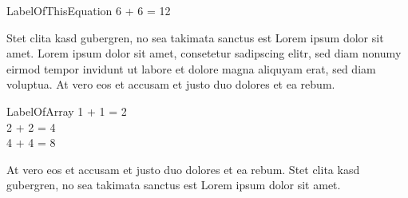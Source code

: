 \begin{EOAequation}{LabelOfThisEquation}
6 + 6 = 12
\end{EOAequation}

\begin{EOAquote}
Stet clita kasd gubergren, no sea
takimata sanctus est Lorem ipsum dolor sit amet.
Lorem ipsum dolor sit amet, consetetur sadipscing
elitr, sed diam nonumy eirmod tempor invidunt ut
labore et dolore magna aliquyam erat, sed diam
voluptua. At vero eos et accusam et justo duo
dolores et ea
rebum.
\end{EOAquote}

\begin{EOAequationarray}{LabelOfArray}
	1 + 1 = 2\\
	2 + 2 = 4\\
	4 + 4 = 8
\end{EOAequationarray}


At vero eos et accusam et justo duo dolores et ea
rebum. Stet clita kasd gubergren, no sea takimata
sanctus est Lorem ipsum dolor sit amet.




\EOAprintbibliography



\EOAprintindex

